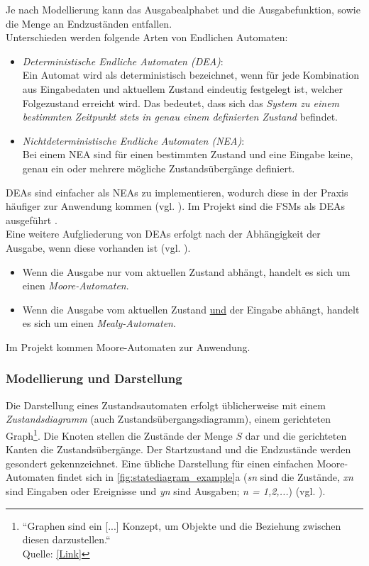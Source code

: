 \documentclass[a4paper, portrait, 12pt]{scrartcl} %
\begin{document}
Je nach Modellierung kann das Ausgabealphabet und die Ausgabefunktion, sowie die Menge an Endzuständen entfallen.\\

Unterschieden werden folgende Arten von Endlichen Automaten:
\begin{itemize}
	\item \emph{Deterministische Endliche Automaten (DEA)}:\\
	Ein Automat wird als deterministisch bezeichnet, wenn für jede Kombination aus Eingabedaten und aktuellem Zustand eindeutig festgelegt ist, welcher Folgezustand erreicht wird. Das bedeutet, dass sich das \emph{System zu einem bestimmten Zeitpunkt stets in genau einem definierten Zustand} befindet.
	\item \emph{Nichtdeterministische Endliche Automaten (NEA)}:\\
	Bei einem NEA sind für einen bestimmten Zustand und eine Eingabe keine, genau ein oder mehrere mögliche Zustandsübergänge definiert.
\end{itemize}

DEAs sind einfacher als NEAs zu implementieren, wodurch diese in der Praxis häufiger zur Anwendung kommen (vgl. \cite[S. 14]{Baesig2019}). Im Projekt sind die FSMs als DEAs ausgeführt .\\

Eine weitere Aufgliederung von DEAs erfolgt nach der Abhängigkeit der Ausgabe, wenn diese vorhanden ist (vgl. \cite[S. 8f]{Baesig2019}).
\begin{itemize}
	\item Wenn die Ausgabe nur vom aktuellen Zustand abhängt, handelt es sich um einen \emph{Moore-Automaten}.
	\item Wenn die Ausgabe vom aktuellen Zustand \underline{und} der Eingabe abhängt, handelt es sich um einen \emph{Mealy-Automaten}.
\end{itemize}
Im Projekt kommen Moore-Automaten zur Anwendung.

\subsubsection{Modellierung und Darstellung}

Die Darstellung eines Zustandsautomaten erfolgt üblicherweise mit einem \emph{Zustandsdiagramm} (auch Zustandsübergangsdiagramm), einem gerichteten Graph\footnote{ ``Graphen sind ein [...] Konzept, um Objekte und die Beziehung zwischen diesen darzustellen.``\\Quelle: \href{https://www.tu-chemnitz.de/informatik/theoretische-informatik/TI-1/lecture-notes/06-00-graphs.html}{[Link]}}. Die Knoten stellen die Zustände der Menge $S$ dar und die gerichteten Kanten die Zustandsübergänge. Der Startzustand und die Endzustände werden gesondert gekennzeichnet. Eine übliche Darstellung für einen einfachen Moore-Automaten findet sich in \autoref{fig:statediagram_example}a (\emph{sn} sind die Zustände, \emph{xn} sind Eingaben oder Ereignisse und \emph{yn} sind Ausgaben; \emph{n = 1,2,...}) (vgl. \cite[S. 9]{Baesig2019}).\\
\end{document}

